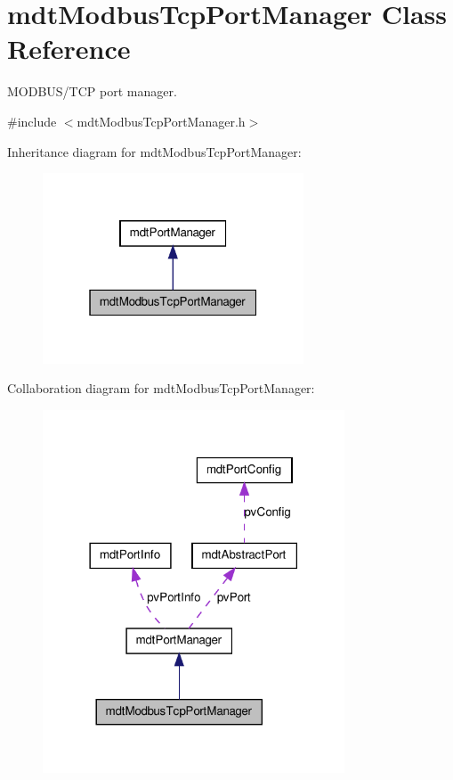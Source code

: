 \hypertarget{classmdt_modbus_tcp_port_manager}{
\section{mdtModbusTcpPortManager Class Reference}
\label{classmdt_modbus_tcp_port_manager}
}


MODBUS/TCP port manager.  




{\ttfamily \#include $<$mdtModbusTcpPortManager.h$>$}



Inheritance diagram for mdtModbusTcpPortManager:
\nopagebreak
\begin{figure}[H]
\begin{center}
\leavevmode
\includegraphics[width=220pt]{classmdt_modbus_tcp_port_manager__inherit__graph}
\end{center}
\end{figure}


Collaboration diagram for mdtModbusTcpPortManager:
\nopagebreak
\begin{figure}[H]
\begin{center}
\leavevmode
\includegraphics[width=254pt]{classmdt_modbus_tcp_port_manager__coll__graph}
\end{center}
\end{figure}
